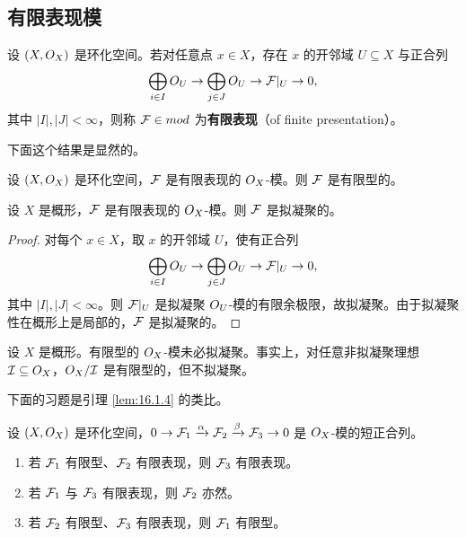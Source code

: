 \subsection{有限表现模}\label{sec:16.2}

\begin{definition}\label{def:16.2.1}
设 $(X,O_X)$ 是环化空间。若对任意点 $x\in X$，存在 $x$ 的开邻域 $U\subseteq X$ 与正合列
\[
\bigoplus_{i\in I}O_U\to\bigoplus_{j\in J}O_U\to\mathcal{F}|_U\to 0,
\]
其中 $|I|,|J|<\infty$，则称 $\mathcal{F}\in mod$ 为\textbf{有限表现}（of finite presentation）。
\end{definition}

下面这个结果是显然的。

\begin{lemma}\label{lem:16.2.2}
设 $(X,O_X)$ 是环化空间，$\mathcal{F}$ 是有限表现的 $O_X$-模。则 $\mathcal{F}$ 是有限型的。
\end{lemma}

\begin{lemma}\label{lem:16.2.3}
设 $X$ 是概形，$\mathcal{F}$ 是有限表现的 $O_X$-模。则 $\mathcal{F}$ 是拟凝聚的。
\end{lemma}

\begin{proof}
对每个 $x\in X$，取 $x$ 的开邻域 $U$，使有正合列
\[
\bigoplus_{i\in I}O_U\to\bigoplus_{j\in J}O_U\to\mathcal{F}|_U\to 0,
\]
其中 $|I|,|J|<\infty$。则 $\mathcal{F}|_U$ 是拟凝聚 $O_U$-模的有限余极限，故拟凝聚。由于拟凝聚性在概形上是局部的，$\mathcal{F}$ 是拟凝聚的。
\end{proof}

\begin{warning}\label{warn:16.2.4}
设 $X$ 是概形。有限型的 $O_X$-模未必拟凝聚。事实上，对任意非拟凝聚理想 $\mathcal{I}\subseteq O_X$，$O_X/\mathcal{I}$ 是有限型的，但不拟凝聚。
\end{warning}

下面的习题是引理 \ref{lem:16.1.4} 的类比。

\begin{exercise}\label{exc:16.2.5}
设 $(X,O_X)$ 是环化空间，$0\to\mathcal{F}_1\xrightarrow{\alpha}\mathcal{F}_2\xrightarrow{\beta}\mathcal{F}_3\to 0$ 是 $O_X$-模的短正合列。
\begin{enumerate}[label=(\arabic*),leftmargin=2em,itemsep=0.25ex]
\item 若 $\mathcal{F}_1$ 有限型、$\mathcal{F}_2$ 有限表现，则 $\mathcal{F}_3$ 有限表现。
\item 若 $\mathcal{F}_1$ 与 $\mathcal{F}_3$ 有限表现，则 $\mathcal{F}_2$ 亦然。
\item 若 $\mathcal{F}_2$ 有限型、$\mathcal{F}_3$ 有限表现，则 $\mathcal{F}_1$ 有限型。
\end{enumerate}
\end{exercise}

